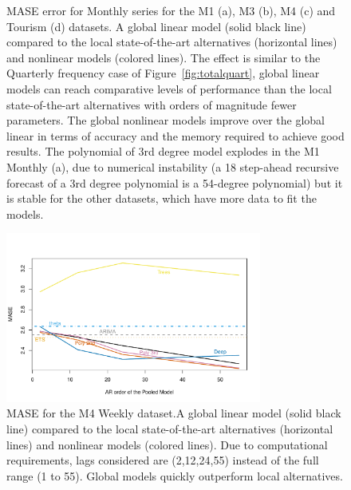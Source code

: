 \documentclass[a4paper]{article}
\theoremstyle{custom}
\begin{document}
\begin{figure}
\caption{MASE error for Monthly series for the M1 (a), M3 (b), M4 (c) and Tourism (d) datasets. A global linear model (solid black line) compared to the local state-of-the-art alternatives (horizontal lines) and nonlinear models (colored lines). The effect is similar to the Quarterly frequency case of Figure~\ref{fig:totalquart}, global linear models can reach comparative levels of performance than the local state-of-the-art alternatives with orders of magnitude fewer parameters. The global nonlinear models improve over the global linear in terms of accuracy and the memory required to achieve good results. The polynomial of 3rd degree model explodes in the M1 Monthly (a), due to numerical instability (a 18 step-ahead recursive forecast of a 3rd degree polynomial is a 54-degree polynomial) but it is stable for the other datasets, which have more data to fit the models.}
\label{fig:totalmonth}
\end{figure}

\begin{figure}
  \centering
  \includegraphics[width=0.75\textwidth]{./fig/MCompandTour/M4WeekNonlin.pdf}
  \caption{MASE for the M4 Weekly dataset.A global linear model (solid black line) compared to the local state-of-the-art alternatives (horizontal lines) and nonlinear models (colored lines). Due to computational requirements, lags considered are (2,12,24,55) instead of the full range (1 to 55). Global models quickly outperform local alternatives.}
  \label{fig:totalweek}
\end{figure}
\end{document}
